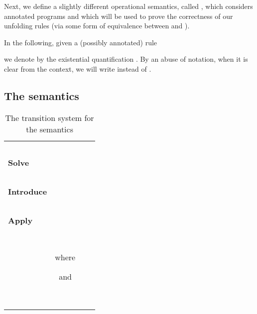 \documentclass{tlp}
\begin{document}
Next, we define a slightly different operational  semantics,
called , which considers annotated programs and which
will be used to prove the correctness of our unfolding rules (via some form of
equivalence between   and ).

In the following, given a (possibly annotated) rule

we denote by  the existential quantification
. By an abuse of notation, when it is clear from the context, we will write
 instead of .

\subsection{The semantics }

\begin{table*}[tbp]
\caption{The transition system  for the  semantics}
\centering
\label{omega-t}

\begin{tabular}{lll}
\hline\noalign{\smallskip}
&\mbox{   }&\mbox{   }
\\
\mbox{\bf Solve} &  



&\mbox{ }
\\
&\mbox{   }&\mbox{   }
\\

\mbox{\bf Introduce}&  &\mbox{ }
\\
&\mbox{   }&\mbox{   }
\\

\mbox{\bf Apply}& &\mbox{ }
\\
&\mbox{   }&\mbox{   }
\\
&\mbox{where }
  
\mbox{ and } &\mbox{
}
\\
&\mbox{   }&\mbox{   }
\\
\noalign{\smallskip}\hline
\end{tabular}
\end{table*}
\end{document}
